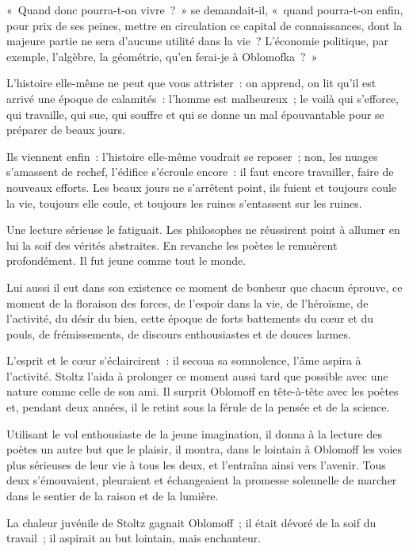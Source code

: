\documentclass[french,twoside]{book} %
\begin{document}
« Quand donc pourra-t-on vivre ? » se demandait-il, « quand pourra-t-on enfin, pour prix de ses peines, mettre en circulation ce capital de connaissances, dont la majeure partie ne sera d’aucune utilité dans la vie ? L’économie politique, par exemple, l’algèbre, la géométrie, qu’en ferai-je à Oblomofka ? »\par
L’histoire elle-même ne peut que vous attrister : on apprend, on lit qu’il est arrivé une époque de calamités : l’homme est malheureux ; le voilà qui s’efforce, qui travaille, qui sue, qui souffre et qui se donne un mal épouvantable pour se préparer de beaux jours.\par
Ils viennent enfin : l’histoire elle-même voudrait se reposer ; non, les nuages s’amassent de rechef, l’édifice s’écroule encore : il faut encore travailler, faire de nouveaux efforts. Les beaux jours ne s’arrêtent point, ils fuient et toujours coule la vie, toujours elle coule, et toujours les ruines s’entassent sur les ruines.\par
Une lecture sérieuse le fatiguait. Les philosophes ne réussirent point à allumer en lui la soif des vérités abstraites. En revanche les poètes le remuèrent profondément. Il fut jeune comme tout le monde.\par
Lui aussi il eut dans son existence ce moment de bonheur que chacun éprouve, ce moment de la floraison des forces, de l’espoir dans la vie, de l’héroïsme, de l’activité, du désir du bien, cette époque de forts battements du cœur et du pouls, de frémissements, de discours enthousiastes et de douces larmes.\par
L’esprit et le cœur s’éclaircirent : il secoua sa somnolence, l’âme aspira à l’activité. Stoltz l’aida à prolonger ce moment aussi tard que possible avec une nature comme celle de son ami. Il surprit Oblomoff en tête-à-tête avec les poètes et, pendant deux années, il le retint sous la férule de la pensée et de la science.\par
Utilisant le vol enthousiaste de la jeune imagination, il donna à la lecture des poètes un autre but que le plaisir, il montra, dans le lointain à Oblomoff les voies plus sérieuses de leur vie à tous les deux, et l’entraîna ainsi vers l’avenir. Tous deux s’émouvaient, pleuraient et échangeaient la promesse solennelle de marcher dans le sentier de la raison et de la lumière.\par
La chaleur juvénile de Stoltz gagnait Oblomoff ; il était dévoré de la soif du travail ; il aspirait au but lointain, mais enchanteur.\par
\end{document}
